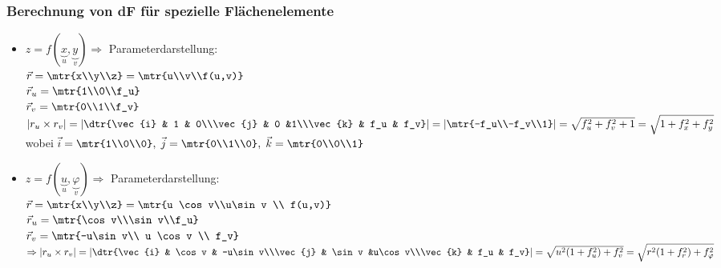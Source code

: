\subsubsection{Berechnung von dF für spezielle Flächenelemente}
\begin{itemize}
\item $z=f(\underbrace{x}_u,\underbrace{y}_v) \Rightarrow$ Parameterdarstellung: \\
$\vec{r}=\mtr{x\\y\\z}=\mtr{u\\v\\f(u,v)}$\\
$\vec{r}_u=\mtr{1\\0\\f_u}$\\
$\vec{r}_v=\mtr{0\\1\\f_v}$\\
$|r_u\times r_v| = | \dtr{\vec{i} & 1 & 0\\\vec{j} & 0 &1\\\vec{k} & f_u & f_v}|=|\mtr{-f_u\\-f_v\\1}|=\sqrt{f_u^2+f_v^2+1}=\sqrt{1+f_x^2+f_y^2}$\\
wobei $\vec{i}=\mtr{1\\0\\0}, \; \vec{j}=\mtr{0\\1\\0}, \; \vec{k}=\mtr{0\\0\\1}$
\item $z=f(\underbrace{u}_u, \underbrace{\varphi}_v) \Rightarrow$ Parameterdarstellung:\\
$\vec{r}=\mtr{x\\y\\z}=\mtr{u \cos v\\u\sin v \\ f(u,v)}$\\
$\vec{r}_u=\mtr{\cos v\\\sin v\\f_u}$\\
$\vec{r}_v=\mtr{-u\sin v\\ u \cos v \\ f_v}$\\
$\Rightarrow |r_u\times r_v| = | \dtr{\vec{i} & \cos v & -u\sin v\\\vec{j} & \sin v &u\cos v\\\vec{k} & f_u & f_v}|=\sqrt{u^2(1+f_u^2)+f_v^2}=\sqrt{r^2(1+f_r^2)+f_\varphi^2}$

\end{itemize}
